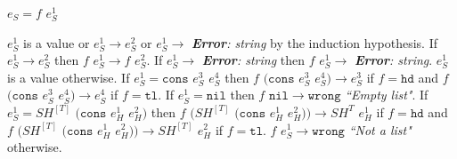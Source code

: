 \begin{case}

$e_{S}=f$ $e_{S}^{1}$

$e_{S}^{1}$ is a value or $e_{S}^{1}\rightarrow e_{S}^{2}$ or $e_{S}^{1}\rightarrow$ \emph{\textbf{Error}: string} by the induction hypothesis.  If $e_{S}^{1}\rightarrow e_{S}^{2}$ then $f$ $e_{S}^{1}\rightarrow f$ $e_{S}^{2}$.  If $e_{S}^{1}\rightarrow$ \emph{\textbf{Error}: string} then $f$ $e_{S}^{1}\rightarrow$ \emph{\textbf{Error}: string}.  $e_{S}^{1}$ is a value otherwise.  If $e_{S}^{1}=\mathtt{cons}$ $e_{S}^{3}$ $e_{S}^{4}$ then $f$ $(\mathtt{cons}$ $e_{S}^{3}$ $e_{S}^{4})\rightarrow e_{S}^{3}$ if $f=\mathtt{hd}$ and $f$ $(\mathtt{cons}$ $e_{S}^{3}$ $e_{S}^{4})\rightarrow e_{S}^{4}$ if $f=\mathtt{tl}$.  If $e_{S}^{1}=\mathtt{nil}$ then $f$ $\mathtt{nil}\rightarrow\mathtt{wrong}$ \emph{``Empty list"}.  If $e_{S}^{1}=SH^{[T]}$ $(\mathtt{cons}$ $e_{H}^{1}$ $e_{H}^{2})$ then $f$ $(SH^{[T]}$ $(\mathtt{cons}$ $e_{H}^{1}$ $e_{H}^{2}))\rightarrow SH^{T}$ $e_{H}^{1}$ if $f=\mathtt{hd}$ and $f$ $(SH^{[T]}$ $(\mathtt{cons}$ $e_{H}^{1}$ $e_{H}^{2}))\rightarrow SH^{[T]}$ $e_{H}^{2}$ if $f=\mathtt{tl}$.  $f$ $e_{S}^{1}\rightarrow\mathtt{wrong}$ \emph{``Not a list"} otherwise.

\end{case}